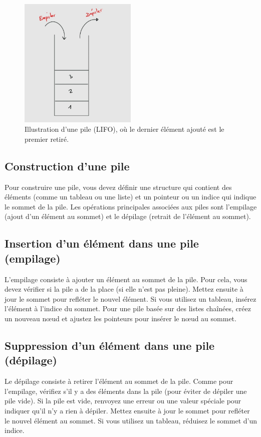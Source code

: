 \begin{figure}[H]
	\centering
	\includegraphics[width=0.5\textwidth]{image/stack} 
	\caption{Illustration d'une pile (LIFO), où le dernier élément ajouté est le premier retiré.}
\end{figure}

\subsection{Construction d'une pile}
Pour construire une pile, vous devez définir une structure qui contient des éléments (comme un tableau ou une liste) et un pointeur ou un indice qui indique le sommet de la pile. Les opérations principales associées aux piles sont l'empilage (ajout d'un élément au sommet) et le dépilage (retrait de l'élément au sommet).

\subsection{Insertion d'un élément dans une pile (empilage)}
L'empilage consiste à ajouter un élément au sommet de la pile. Pour cela, vous devez vérifier si la pile a de la place (si elle n'est pas pleine). Mettez ensuite à jour le sommet pour refléter le nouvel élément. Si vous utilisez un tableau, insérez l'élément à l'indice du sommet. Pour une pile basée sur des listes chaînées, créez un nouveau nœud et ajustez les pointeurs pour insérer le nœud au sommet.

\subsection{Suppression d'un élément dans une pile (dépilage)}
Le dépilage consiste à retirer l'élément au sommet de la pile. Comme pour l'empilage, vérifiez s'il y a des éléments dans la pile (pour éviter de dépiler une pile vide). Si la pile est vide, renvoyez une erreur ou une valeur spéciale pour indiquer qu'il n'y a rien à dépiler. Mettez ensuite à jour le sommet pour refléter le nouvel élément au sommet. Si vous utilisez un tableau, réduisez le sommet d'un indice.

